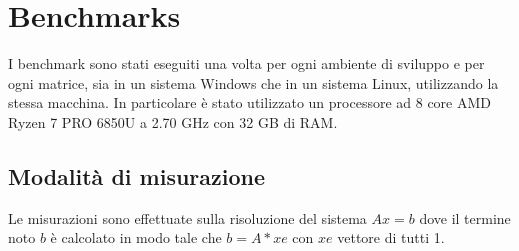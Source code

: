 \documentclass{report}
\begin{document}
    \chapter{Benchmarks}
        I benchmark sono stati eseguiti una volta per ogni ambiente di sviluppo e per ogni matrice, sia in un sistema
        Windows che in un sistema Linux, utilizzando la stessa macchina.
        In particolare è stato utilizzato un processore ad 8 core AMD Ryzen 7 PRO 6850U a 2.70 GHz con 32 GB di RAM.

        \section{Modalità di misurazione}

            Le misurazioni sono effettuate sulla risoluzione del sistema $Ax = b$ dove il termine noto $b$ è calcolato
            in modo tale che $b = A*xe$ con $xe$ vettore di tutti 1.\\
\end{document}
